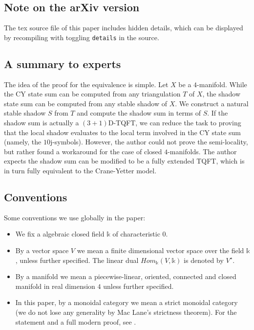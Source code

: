 \documentclass[12pt]{extarticle}
\numberwithin{equation}{section} %
\theoremstyle{mystyle}
\newcommand{\details}[1]{
    {\color{OliveGreen} #1} \\}
\begin{document}
\subsection{Note on the arXiv version}
The tex source file of this paper includes hidden details, which
can be displayed by recompiling with toggling \texttt{details} in
the source.

\subsection{A summary to experts}\label{subsection/a-summary-to-experts}

The idea of the proof for the equivalence is simple. Let $X$ be a
$4$-manifold. While the CY state sum can be computed from any
triangulation $T$ of $X$, the shadow state sum can be computed
from any stable shadow of $X$. We construct a natural stable
shadow $S$ from $T$ and compute the shadow sum in terms of $S$.
If the shadow sum is actually a $(3+1)$D-TQFT, we can reduce the
task to proving that the local shadow evaluates to the local term
involved in the CY state sum (namely, the $10$j-symbols).
However, the author could not prove the semi-locality, but rather
found a workaround for the case of closed $4$-manifolds. The
author expects the shadow sum can be modified to be a fully
extended TQFT, which is in turn fully equivalent to the
Crane-Yetter model.

\subsection{Conventions}

\noindent Some conventions we use globally in the paper:

\begin{itemize}
  \item We fix a algebraic closed field $\mathbb{k}$ of
        characteristic $0$.
  \item By a vector space $V$ we mean a finite dimensional vector
        space over the field $\mathbb{k}$, unless further
        specified. The linear dual
        $Hom_{\mathbb{k}}(V,\mathbb{k})$ is denoted by
        $V^{\star}$.
  \item By a manifold we mean a piecewise-linear, oriented,
        connected and closed manifold in real dimension $4$
        unless further specified.
  \item In this paper, by a monoidal category we mean a strict
        monoidal category (we do not lose any generality by Mac
        Lane's strictness theorem). \details{For the statement
        and a full modern proof, see \cite[theorem
        2.8.5]{egno/tensor-cats}.}
\end{itemize}
\end{document}
